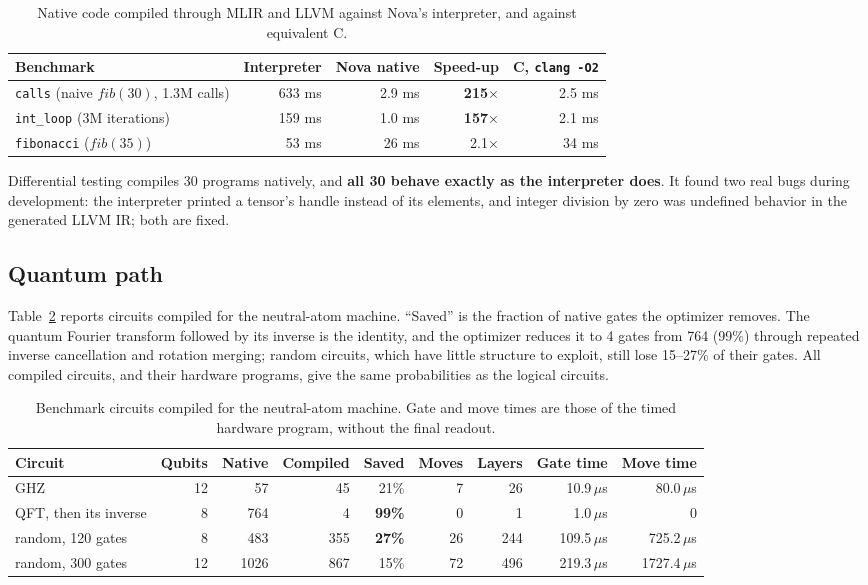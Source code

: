 \documentclass[11pt]{article}
\begin{document}
\begin{table}[h]
\centering
\caption{Native code compiled through MLIR and LLVM against Nova's interpreter, and against equivalent C.}
\label{tab:classical}
\begin{tabular}{lrrrr}
\toprule
Benchmark & Interpreter & Nova native & Speed-up & C, \texttt{clang -O2} \\
\midrule
\texttt{calls} (naive $\mathit{fib}(30)$, 1.3M calls) & 633 ms & 2.9 ms & \textbf{215$\times$} & 2.5 ms \\
\texttt{int\_loop} (3M iterations)                     & 159 ms & 1.0 ms & \textbf{157$\times$} & 2.1 ms \\
\texttt{fibonacci} ($\mathit{fib}(35)$)                &  53 ms &  26 ms & 2.1$\times$         &  34 ms \\
\bottomrule
\end{tabular}
\end{table}

Differential testing compiles 30 programs natively, and \textbf{all 30 behave exactly as the interpreter does}. It
found two real bugs during development: the interpreter printed a tensor's handle instead of its elements, and
integer division by zero was undefined behavior in the generated LLVM IR; both are fixed.

\subsection{Quantum path}

Table~\ref{tab:quantum} reports circuits compiled for the neutral-atom machine. ``Saved'' is the fraction of native
gates the optimizer removes. The quantum Fourier transform followed by its inverse is the identity, and the
optimizer reduces it to 4 gates from 764 (99\%) through repeated inverse cancellation and rotation merging; random
circuits, which have little structure to exploit, still lose 15--27\% of their gates. All compiled circuits, and their
hardware programs, give the same probabilities as the logical circuits.

\begin{table}[h]
\centering
\caption{Benchmark circuits compiled for the neutral-atom machine. Gate and move times are those of the timed
hardware program, without the final readout.}
\label{tab:quantum}
\begin{tabular}{lrrrrrrrr}
\toprule
Circuit & Qubits & Native & Compiled & Saved & Moves & Layers & Gate time & Move time \\
\midrule
GHZ                     & 12 &   57 &  45 & 21\%          &  7 &  26 &  10.9\,$\mu$s &   80.0\,$\mu$s \\
QFT, then its inverse   &  8 &  764 &   4 & \textbf{99\%} &  0 &   1 &   1.0\,$\mu$s &    0 \\
random, 120 gates       &  8 &  483 & 355 & \textbf{27\%} & 26 & 244 & 109.5\,$\mu$s &  725.2\,$\mu$s \\
random, 300 gates       & 12 & 1026 & 867 & 15\%          & 72 & 496 & 219.3\,$\mu$s & 1727.4\,$\mu$s \\
\bottomrule
\end{tabular}
\end{table}
\end{document}
